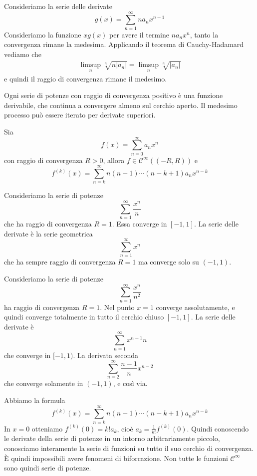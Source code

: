 \documentclass[a4paper]{article}
\begin{document}
\begin{snippetproof}{}
    Consideriamo la serie delle derivate
    \[
        g(x) = \sum_{n=1}^\infty na_nx^{n-1}
    \]
    Consideriamo la funzione \(xg(x)\) per avere il termine \(na_nx^n\),
    tanto la convergenza rimane la medesima. Applicando il teorema di Cauchy-Hadamard
    vediamo che
    \begin{align*}
        \limsup_n \sqrt[n]{
            n|a_n|
        } = \limsup_n \sqrt[n]{|a_n|}
    \end{align*}
    e quindi il raggio di convergenza rimane il medesimo.
\end{snippetproof}

Ogni serie di potenze con raggio di convergenza positivo è una funzione derivabile,
che continua a convergere almeno sul cerchio aperto.
Il medesimo processo può essere iterato per derivate superiori.

\begin{snippetcorollary}{}
    Sia \[
        f(x) = \sum_{n=0}^\infty a_nx^n
    \]
    con raggio di convergenza \(R > 0\), allora \(f\in \mathcal C^\infty((-R, R))\) e \[
        f^{(k)}(x) = \sum_{n=k}^\infty n(n-1)\cdots(n-k+1)a_nx^{n-k}
    \]
\end{snippetcorollary}

\begin{snippetexample}{}
    Consideriamo la serie di potenze
    \[
        \sum_{n=1}^\infty \frac{x^n}{n}
    \]
    che ha raggio di convergenza \(R=1\).
    Essa converge in \([-1, 1]\). La serie delle derivate è la serie geometrica
    \[
        \sum_{n=1}^\infty x^n
    \]
    che ha sempre raggio di convergenza \(R=1\)
    ma converge solo su \((-1, 1)\).
\end{snippetexample}

\begin{snippetcorollary}{}
    Consideriamo la serie di potenze
    \[
        \sum_{n=1}^\infty \frac{x^n}{n^2}
    \]
    ha raggio di convergenza \(R=1\).
    Nel punto \(x=1\) converge assolutamente, e quindi converge totalmente in tutto il cerchio
    chiuso \([-1, 1]\). La serie delle derivate è
    \[
        \sum_{n=1}^\infty x^{n-1}{n}
    \]
    che converge in \([-1, 1)\). La derivata seconda
    \[
        \sum_{n=2}^\infty \frac{n-1}{n}x^{n-2}
    \]
    che converge solamente in \((-1, 1)\), e così via.
\end{snippetcorollary}

Abbiamo la formula \[
    f^{(k)}(x) = \sum_{n=k}^\infty n(n-1)\cdots(n-k+1)a_nx^{n-k}
\]
In \(x=0\) otteniamo \(f^{(k)}(0) = k! a_k\), cioè \(a_k = \frac{1}{k!}f^{(k)}(0)\).
Quindi conoscendo le derivate della serie di potenze in un intorno arbitrariamente piccolo,
conosciamo interamente la serie di funzioni su tutto il suo cerchio di convergenza.
È quindi impossibili avere fenomeni di biforcazione.
Non tutte le funzioni \(\mathcal C^\infty\) sono quindi serie di potenze.
\end{document}
